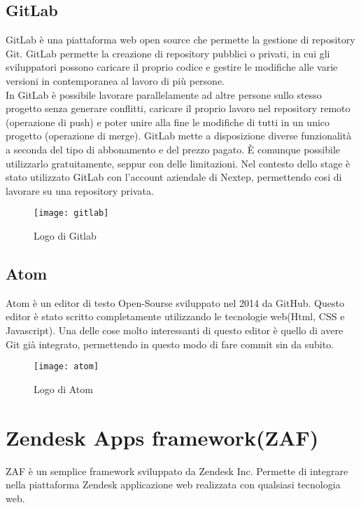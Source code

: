 \subsection{GitLab}GitLab è una piattaforma web open source che permette la gestione di repository Git. GitLab permette la creazione di repository pubblici o privati, in cui gli sviluppatori possono caricare il proprio codice e gestire le modifiche alle varie versioni in contemporanea al lavoro di più persone. 
\\

In GitLab è possibile lavorare parallelamente ad altre persone sullo stesso progetto senza generare conflitti, caricare il proprio lavoro nel repository remoto (operazione di push) e poter unire alla fine le modifiche di tutti in un unico progetto (operazione di merge). GitLab mette a disposizione diverse funzionalità a seconda del tipo di abbonamento e del prezzo pagato. È comunque possibile utilizzarlo gratuitamente, seppur con delle limitazioni. Nel contesto dello stage è stato utilizzato GitLab con l'account aziendale di Nextep, permettendo cosi di lavorare su una repository privata. 
\begin{figure}[!h] 
	\centering 
	\texttt{[image: gitlab]}
	\caption{Logo di Gitlab}
\end{figure}
\subsection{Atom}
Atom è un editor di testo Open-Sourse sviluppato nel 2014 da GitHub. Questo editor è stato scritto completamente utilizzando le tecnologie web(Html, CSS e Javascript). 
Una delle cose molto interessanti di questo editor è quello di avere Git già integrato, permettendo in questo modo di fare commit sin da subito. 
\begin{figure}[!h] 
	\centering 
	\texttt{[image: atom]}
	\caption{Logo di Atom}
\end{figure}
 
\section{Zendesk Apps framework(ZAF)}
ZAF è un semplice framework sviluppato da Zendesk Inc. Permette di integrare nella piattaforma Zendesk applicazione web realizzata con qualsiasi tecnologia web. 
\\

